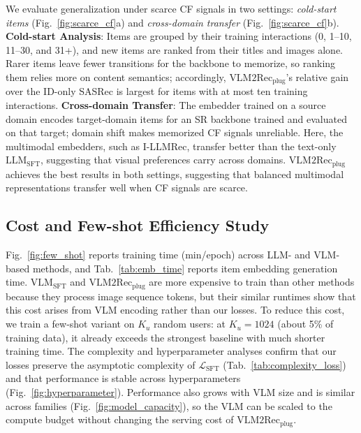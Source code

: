 We evaluate generalization under scarce CF signals in two settings: \textit{cold-start items} (Fig.~\ref{fig:scarce_cf}a) and \textit{cross-domain transfer} (Fig.~\ref{fig:scarce_cf}b).
\noindent\textbf{Cold-start Analysis}: 
Items are grouped by their training interactions (0, 1--10, 11--30, and 31+), and new items are ranked from their titles and images alone.
Rarer items leave fewer transitions for the backbone to memorize, so ranking them relies more on content semantics; accordingly, $\text{VLM2Rec}_{\text{plug}}$'s relative gain over the ID-only SASRec is largest for items with at most ten training interactions.
\noindent\textbf{Cross-domain Transfer}: The embedder trained on a source domain encodes target-domain items for an SR backbone trained and evaluated on that target; domain shift makes memorized CF signals unreliable.
Here, the multimodal embedders, such as I-LLMRec, transfer better than the text-only $\text{LLM}_{\text{SFT}}$, suggesting that visual preferences carry across domains.
$\text{VLM2Rec}_{\text{plug}}$ achieves the best results in both settings, suggesting that balanced multimodal representations transfer well when CF signals are scarce.


\subsection{Cost and Few-shot Efficiency Study}
\label{sec:few_shot}

Fig.~\ref{fig:few_shot} reports training time (min/epoch) across LLM- and VLM-based methods, and Tab.~\ref{tab:emb_time} reports item embedding generation time.
$\text{VLM}_{\text{SFT}}$ and $\text{VLM2Rec}_{\text{plug}}$ are more expensive to train than other methods because they process image sequence tokens, but their similar runtimes show that this cost arises from VLM encoding rather than our losses.
To reduce this cost, we train a few-shot variant on $K_u$ random users: at $K_u{=}1024$ (about 5\% of training data), it already exceeds the strongest baseline with much shorter training time.
The complexity and hyperparameter analyses confirm that our losses preserve the asymptotic complexity of $\mathcal{L}_{\text{SFT}}$ (Tab.~\ref{tab:complexity_loss}) and that performance is stable across hyperparameters (Fig.~\ref{fig:hyperparameter}).
Performance also grows with VLM size and is similar across families (Fig.~\ref{fig:model_capacity}), so the VLM can be scaled to the compute budget without changing the serving cost of $\text{VLM2Rec}_{\text{plug}}$.

 